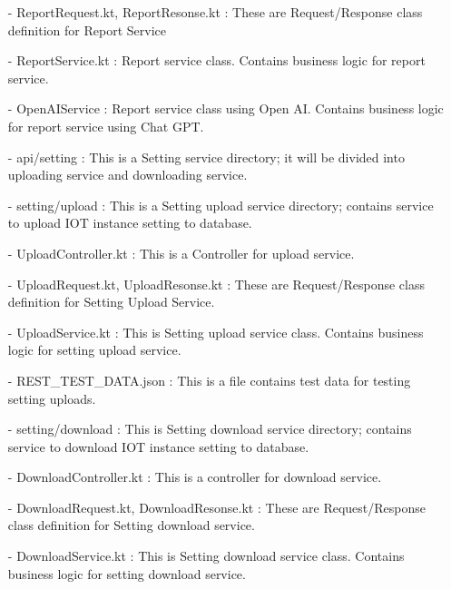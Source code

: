 \documentclass[conference]{IEEEtran}
\begin{document}
\begin{enumerate}
        \item [-] ReportRequest.kt, ReportResonse.kt  : These are Request/Response class definition for Report Service\\
        \item [-] ReportService.kt :  Report service class. Contains business logic for report service.\\
        \item [-] OpenAIService : Report service class using Open AI. Contains business logic for report
service using Chat GPT.\\
        \item [-] api/setting : This is a Setting service directory; it will be divided into uploading service and downloading service.\\
        \item [-] setting/upload : This is a Setting upload service directory; contains service to upload IOT instance setting to database.\\
        \item [-] UploadController.kt : This is a Controller for upload service.\\
        \item [-] UploadRequest.kt, UploadResonse.kt : These are Request/Response class definition for Setting Upload Service.\\
        \item [-] UploadService.kt : This is Setting upload service class. Contains business logic for setting upload service.\\
        \item [-] REST\_TEST\_DATA.json : This is a file contains test data for testing setting uploads.\\
        \item [-] setting/download : This is Setting download service directory; contains service to download IOT instance setting to
database.\\
        \item [-] DownloadController.kt : This is a controller for download service.\\
        \item [-] DownloadRequest.kt, DownloadResonse.kt : These are Request/Response class definition for Setting download service.\\
        \item [-] DownloadService.kt : This is Setting download service class. Contains business logic for setting download service.\\

\end{enumerate}
\end{document}

